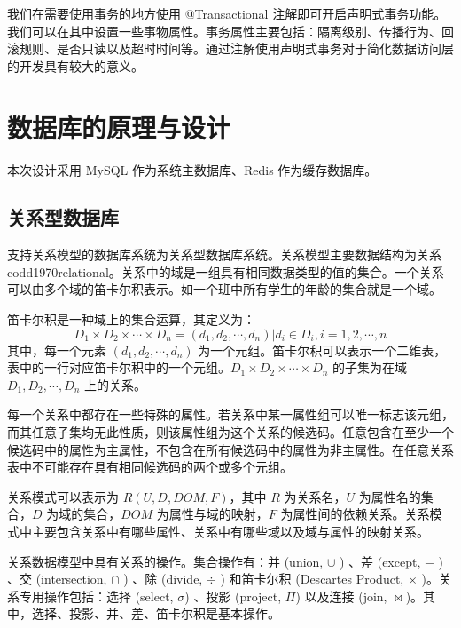  我们在需要使用事务的地方使用 @Transactional\cite{spring2019} 注解即可开启声明式事务功能。我们可以在其中设置一些事物属性。事务属性主要包括：隔离级别、传播行为、回滚规则、是否只读以及超时时间等。通过注解使用声明式事务对于简化数据访问层的开发具有较大的意义\cite{walls2016spring}。


\section{数据库的原理与设计}

本次设计采用 MySQL 作为系统主数据库、Redis 作为缓存数据库。


\subsection{关系型数据库}
支持关系模型的数据库系统为关系型数据库系统。关系模型主要数据结构为关系{codd1970relational}。关系中的域是一组具有相同数据类型的值的集合。一个关系可以由多个域的笛卡尔积表示。如一个班中所有学生的年龄的集合就是一个域\cite{王珊2006数据库系统概论}。

笛卡尔积是一种域上的集合运算，其定义为：
\begin{equation}
\label{eq:Descartes}
D_1 \times D_2 \times \cdots \times D_n = {(d_1, d_2, \cdots, d_n) | d_i \in D_i, i=1, 2, \cdots, n}
\end{equation}
其中，每一个元素 $(d_1, d_2, \cdots, d_n)$ 为一个元组。笛卡尔积可以表示一个二维表，表中的一行对应笛卡尔积中的一个元组。$D_1 \times D_2 \times \cdots \times D_n$ 的子集为在域 $D_1, D_2, \cdots, D_n$ 上的关系\cite{codd1970relational}。

每一个关系中都存在一些特殊的属性。若关系中某一属性组可以唯一标志该元组，而其任意子集均无此性质，则该属性组为这个关系的候选码。任意包含在至少一个候选码中的属性为主属性，不包含在所有候选码中的属性为非主属性。在任意关系表中不可能存在具有相同候选码的两个或多个元组\cite{codd1970relational,王珊2006数据库系统概论}。

关系模式可以表示为 $R(U, D, DOM, F)$，其中 $R$ 为关系名，$U$ 为属性名的集合，$D$ 为域的集合，$DOM$ 为属性与域的映射，$F$ 为属性间的依赖关系。关系模式中主要包含关系中有哪些属性、关系中有哪些域以及域与属性的映射关系。

关系数据模型中具有关系的操作。集合操作有：并 (union, $\cup$ ) 、差 (except, $-$ ) 、交 (intersection, $\cap$ ) 、除 (divide, $\div$ ) 和笛卡尔积 (Descartes Product, $\times$ )。关系专用操作包括：选择 (select, $\sigma$) 、投影 (project, $\Pi$) 以及连接 (join, $\Join $)。其中，选择、投影、并、差、笛卡尔积是基本操作\cite{ullman1984principles}。

